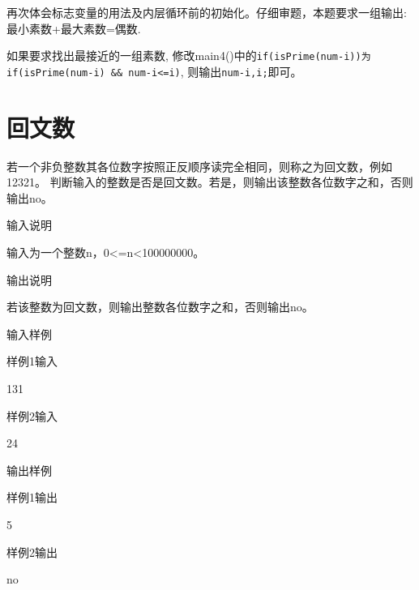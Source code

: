 \begin{note}[要点]
	再次体会标志变量的用法及内层循环前的初始化。仔细审题，本题要求一组输出: 最小素数+最大素数=偶数.
	
	如果要求找出最接近的一组素数, 修改main4()中的\lstinline|if(isPrime(num-i))为if(isPrime(num-i) && num-i<=i)|, 则输出\lstinline|num-i,i;|即可。
\end{note}

\section{回文数}
若一个非负整数其各位数字按照正反顺序读完全相同，则称之为回文数，例如12321。
判断输入的整数是否是回文数。若是，则输出该整数各位数字之和，否则输出no。

输入说明	

输入为一个整数n，0<=n<100000000。

输出说明	

若该整数为回文数，则输出整数各位数字之和，否则输出no。

输入样例
	
样例1输入

131

样例2输入

24

输出样例

样例1输出
	
5

样例2输出

no

